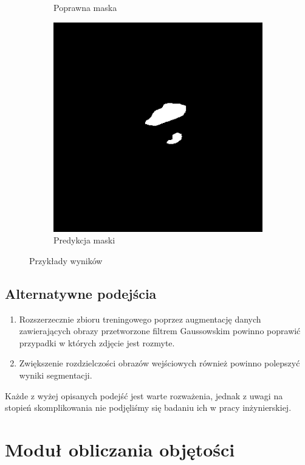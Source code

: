 \documentclass[a4paper,11pt,twoside]{report}
\theoremstyle{definition}
\begin{document}
\begin{figure}[htb]
\begin{subfigure}{0.25\textwidth}
		\caption{Poprawna maska}
		\label{fig:5}
	\end{subfigure}\hfil %
	\begin{subfigure}{0.25\textwidth}
		\includegraphics[width=\linewidth]{segmentation/segmentation_mask_2.png}
		\caption{Predykcja maski}
		\label{fig:6}
	\end{subfigure}
	\caption{Przykłady wyników}
	\label{fig:images}
\end{figure}

\subsection{Alternatywne podejścia}
\begin{enumerate}
\item Rozszerzecznie zbioru treningowego poprzez augmentację danych zawierających obrazy przetworzone filtrem Gaussowskim powinno poprawić przypadki w których zdjęcie jest rozmyte.
\item Zwiększenie rozdzielczości obrazów wejściowych również powinno polepszyć wyniki segmentacji.
\end{enumerate}
Każde z wyżej opisanych podejść jest warte rozważenia, jednak z uwagi na stopień skomplikowania nie podjęliśmy się badaniu ich w pracy inżynierskiej.


\section{Moduł obliczania objętości}
\end{document}
